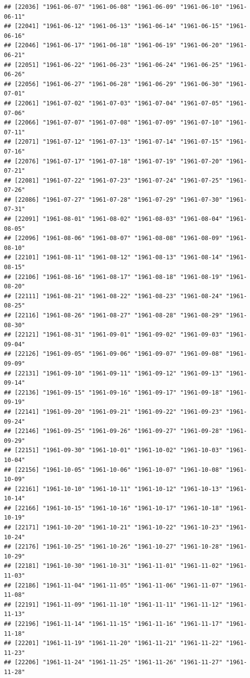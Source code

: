 \documentclass{article}\usepackage[]{graphicx}\usepackage[]{color}
\makeatletter
\newenvironment{kframe}{%
 \def\at@end@of@kframe{}%
 \ifinner\ifhmode%
  \def\at@end@of@kframe{\end{minipage}}%
  \begin{minipage}{\columnwidth}%
 \fi\fi%
 \def\FrameCommand##1{\hskip\@totalleftmargin \hskip-\fboxsep
 \colorbox{shadecolor}{##1}\hskip-\fboxsep
     \hskip-\linewidth \hskip-\@totalleftmargin \hskip\columnwidth}%
 \MakeFramed {\advance\hsize-\width
   \@totalleftmargin\z@ \linewidth\hsize
   \@setminipage}}%
 {\par\unskip\endMakeFramed%
 \at@end@of@kframe}
\newenvironment{knitrout}{}{} %
\makeatother
\begin{document}
\begin{description}
\begin{knitrout}
\begin{kframe}
\begin{verbatim}
## [22036] "1961-06-07" "1961-06-08" "1961-06-09" "1961-06-10" "1961-06-11"
## [22041] "1961-06-12" "1961-06-13" "1961-06-14" "1961-06-15" "1961-06-16"
## [22046] "1961-06-17" "1961-06-18" "1961-06-19" "1961-06-20" "1961-06-21"
## [22051] "1961-06-22" "1961-06-23" "1961-06-24" "1961-06-25" "1961-06-26"
## [22056] "1961-06-27" "1961-06-28" "1961-06-29" "1961-06-30" "1961-07-01"
## [22061] "1961-07-02" "1961-07-03" "1961-07-04" "1961-07-05" "1961-07-06"
## [22066] "1961-07-07" "1961-07-08" "1961-07-09" "1961-07-10" "1961-07-11"
## [22071] "1961-07-12" "1961-07-13" "1961-07-14" "1961-07-15" "1961-07-16"
## [22076] "1961-07-17" "1961-07-18" "1961-07-19" "1961-07-20" "1961-07-21"
## [22081] "1961-07-22" "1961-07-23" "1961-07-24" "1961-07-25" "1961-07-26"
## [22086] "1961-07-27" "1961-07-28" "1961-07-29" "1961-07-30" "1961-07-31"
## [22091] "1961-08-01" "1961-08-02" "1961-08-03" "1961-08-04" "1961-08-05"
## [22096] "1961-08-06" "1961-08-07" "1961-08-08" "1961-08-09" "1961-08-10"
## [22101] "1961-08-11" "1961-08-12" "1961-08-13" "1961-08-14" "1961-08-15"
## [22106] "1961-08-16" "1961-08-17" "1961-08-18" "1961-08-19" "1961-08-20"
## [22111] "1961-08-21" "1961-08-22" "1961-08-23" "1961-08-24" "1961-08-25"
## [22116] "1961-08-26" "1961-08-27" "1961-08-28" "1961-08-29" "1961-08-30"
## [22121] "1961-08-31" "1961-09-01" "1961-09-02" "1961-09-03" "1961-09-04"
## [22126] "1961-09-05" "1961-09-06" "1961-09-07" "1961-09-08" "1961-09-09"
## [22131] "1961-09-10" "1961-09-11" "1961-09-12" "1961-09-13" "1961-09-14"
## [22136] "1961-09-15" "1961-09-16" "1961-09-17" "1961-09-18" "1961-09-19"
## [22141] "1961-09-20" "1961-09-21" "1961-09-22" "1961-09-23" "1961-09-24"
## [22146] "1961-09-25" "1961-09-26" "1961-09-27" "1961-09-28" "1961-09-29"
## [22151] "1961-09-30" "1961-10-01" "1961-10-02" "1961-10-03" "1961-10-04"
## [22156] "1961-10-05" "1961-10-06" "1961-10-07" "1961-10-08" "1961-10-09"
## [22161] "1961-10-10" "1961-10-11" "1961-10-12" "1961-10-13" "1961-10-14"
## [22166] "1961-10-15" "1961-10-16" "1961-10-17" "1961-10-18" "1961-10-19"
## [22171] "1961-10-20" "1961-10-21" "1961-10-22" "1961-10-23" "1961-10-24"
## [22176] "1961-10-25" "1961-10-26" "1961-10-27" "1961-10-28" "1961-10-29"
## [22181] "1961-10-30" "1961-10-31" "1961-11-01" "1961-11-02" "1961-11-03"
## [22186] "1961-11-04" "1961-11-05" "1961-11-06" "1961-11-07" "1961-11-08"
## [22191] "1961-11-09" "1961-11-10" "1961-11-11" "1961-11-12" "1961-11-13"
## [22196] "1961-11-14" "1961-11-15" "1961-11-16" "1961-11-17" "1961-11-18"
## [22201] "1961-11-19" "1961-11-20" "1961-11-21" "1961-11-22" "1961-11-23"
## [22206] "1961-11-24" "1961-11-25" "1961-11-26" "1961-11-27" "1961-11-28"

\end{verbatim}
\end{kframe}
\end{knitrout}
\end{description}
\end{document}
